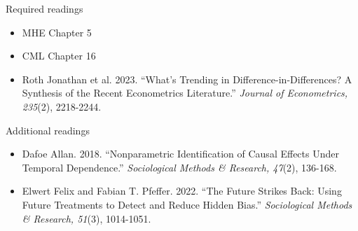 \documentclass[12pt]{article}
\begin{document}
\noindent Required readings
\begin{itemize}
    \item MHE Chapter 5
    \item CML Chapter 16
    \item Roth Jonathan et al. 2023. ``What’s Trending in Difference-in-Differences? A Synthesis of the Recent Econometrics Literature.'' \textit{Journal of Econometrics, 235}(2), 2218-2244.
\end{itemize}

\noindent Additional readings
\begin{itemize}
    \item Dafoe Allan. 2018. ``Nonparametric Identification of Causal Effects Under Temporal Dependence.'' \textit{Sociological Methods \& Research, 47}(2), 136-168.
    \item Elwert Felix and Fabian T. Pfeffer. 2022. ``The Future Strikes Back: Using Future Treatments to Detect and Reduce Hidden Bias.'' \textit{Sociological Methods \& Research, 51}(3), 1014-1051.
\end{itemize}

\end{document}

